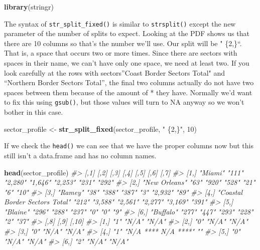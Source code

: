 \documentclass[
  12pt,
]{book}
\newenvironment{Shaded}{\begin{snugshade}}{\end{snugshade}}
\newcommand{\CommentTok}[1]{\textcolor[rgb]{0.37,0.37,0.37}{\textit{#1}}}
\newcommand{\DecValTok}[1]{\textcolor[rgb]{0.06,0.06,0.06}{#1}}
\newcommand{\KeywordTok}[1]{\textcolor[rgb]{0.27,0.27,0.27}{\textbf{#1}}}
\newcommand{\NormalTok}[1]{#1}
\newcommand{\StringTok}[1]{\textcolor[rgb]{0.5,0.5,0.5}{#1}}
\begin{document}
\begin{Shaded}
\begin{Highlighting}[]
\KeywordTok{library}\NormalTok{(stringr)}
\end{Highlighting}
\end{Shaded}

The syntax of \texttt{str\_split\_fixed()} is similar to \texttt{strsplit()} except the new parameter of the number of splits to expect. Looking at the PDF shows us that there are 10 columns so that's the number we'll use. Our split will be " \{2,\}``. That is, a space that occurs two or more times. Since there are sectors with spaces in their name, we can't have only one space, we need at least two. If you look carefully at the rows with sectors''Coast Border Sectors Total" and ``Northern Border Sectors Total'', the final two columns actually do not have two spaces between them because of the amount of * they have. Normally we'd want to fix this using \texttt{gsub()}, but those values will turn to NA anyway so we won't bother in this case.

\begin{Shaded}
\begin{Highlighting}[]
\NormalTok{sector\_profile <{-}}\StringTok{ }\KeywordTok{str\_split\_fixed}\NormalTok{(sector\_profile, }\StringTok{" \{2,\}"}\NormalTok{, }\DecValTok{10}\NormalTok{)}
\end{Highlighting}
\end{Shaded}

If we check the \texttt{head()} we can see that we have the proper columns now but this still isn't a data.frame and has no column names.

\begin{Shaded}
\begin{Highlighting}[]
\KeywordTok{head}\NormalTok{(sector\_profile)}
\CommentTok{\#>      [,1]                           [,2]  [,3]    [,4]    [,5]    [,6]    [,7] }
\CommentTok{\#> [1,] "Miami"                        "111" "2,280" "1,646" "2,253" "231"   "292"}
\CommentTok{\#> [2,] "New Orleans"                  "63"  "920"   "528"   "21"    "6"     "10" }
\CommentTok{\#> [3,] "Ramey"                        "38"  "388"   "387"   "3"     "2,932" "89" }
\CommentTok{\#> [4,] "Coastal Border Sectors Total" "212" "3,588" "2,561" "2,277" "3,169" "391"}
\CommentTok{\#> [5,] "Blaine"                       "296" "288"   "237"   "0"     "0"     "9"  }
\CommentTok{\#> [6,] "Buffalo"                      "277" "447"   "293"   "228"   "2"     "37" }
\CommentTok{\#>      [,8] [,9]                [,10]}
\CommentTok{\#> [1,] "1"  "N/A"               "N/A"}
\CommentTok{\#> [2,] "0"  "N/A"               "N/A"}
\CommentTok{\#> [3,] "0"  "N/A"               "N/A"}
\CommentTok{\#> [4,] "1"  "N/A **** N/A ****" ""   }
\CommentTok{\#> [5,] "0"  "N/A"               "N/A"}
\CommentTok{\#> [6,] "2"  "N/A"               "N/A"}
\end{Highlighting}
\end{Shaded}
\end{document}
